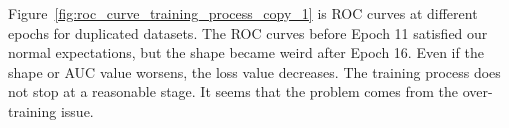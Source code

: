 \documentclass[12pt]{article}
\begin{document}
            Figure~\ref{fig:roc_curve_training_process_copy_1} is ROC curves at different epochs for duplicated datasets. The ROC curves before Epoch 11 satisfied our normal expectations, but the shape became weird after Epoch 16. Even if the shape or AUC value worsens, the loss value decreases. The training process does not stop at a reasonable stage. It seems that the problem comes from the over-training issue.
            \begin{figure}[htpb]
                \centering
                 \\ 
\end{figure}
\end{document}
